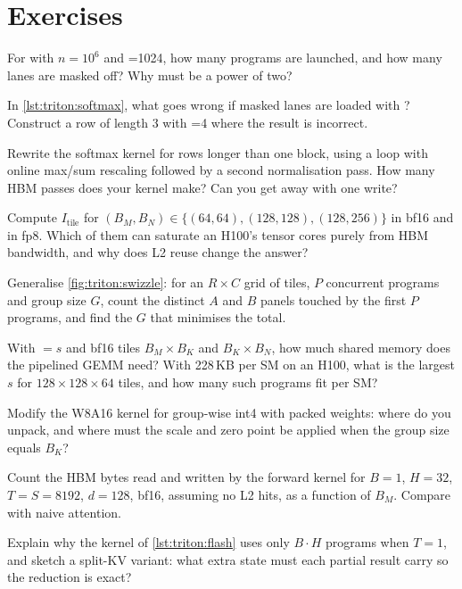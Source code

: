 \section{Exercises}
\begin{exercise}
For  with $n=10^6$ and =1024, how many programs are
launched, and how many lanes are masked off? Why must  be a power of two?
\end{exercise}
\begin{exercise}
In \cref{lst:triton:softmax}, what goes wrong if masked lanes are loaded with
? Construct a row of length 3 with =4 where the result is
incorrect.
\end{exercise}
\begin{exercise}
Rewrite the softmax kernel for rows longer than one block, using a loop with online
max/sum rescaling followed by a second normalisation pass. How many HBM passes does your
kernel make? Can you get away with one write?
\end{exercise}
\begin{exercise}
Compute $I_{\text{tile}}$ for $(B_M,B_N)\in\{(64,64),(128,128),(128,256)\}$ in bf16 and
in fp8. Which of them can saturate an H100's tensor cores purely from HBM bandwidth, and
why does L2 reuse change the answer?
\end{exercise}
\begin{exercise}[swizzling]
Generalise \cref{fig:triton:swizzle}: for an $R\times C$ grid of tiles, $P$ concurrent
programs and group size $G$, count the distinct $A$ and $B$ panels touched by the first
$P$ programs, and find the $G$ that minimises the total.
\end{exercise}
\begin{exercise}
With $=s$ and bf16 tiles $B_M\times B_K$ and $B_K\times B_N$, how
much shared memory does the pipelined GEMM need? With 228\,KB per SM on an H100, what is
the largest $s$ for $128\times128\times64$ tiles, and how many such programs fit per SM?
\end{exercise}
\begin{exercise}
Modify the W8A16 kernel for group-wise int4 with packed weights: where do you unpack,
and where must the scale and zero point be applied when the group size equals $B_K$?
\end{exercise}
\begin{exercise}
Count the HBM bytes read and written by the forward kernel for $B=1$, $H=32$,
$T=S=8192$, $d=128$, bf16, assuming no L2 hits, as a function of $B_M$. Compare with
naive attention.
\end{exercise}
\begin{exercise}
Explain why the kernel of \cref{lst:triton:flash} uses only $B\cdot H$ programs when
$T=1$, and sketch a split-KV variant: what extra state must each partial result carry so
the reduction is exact?
\end{exercise}

